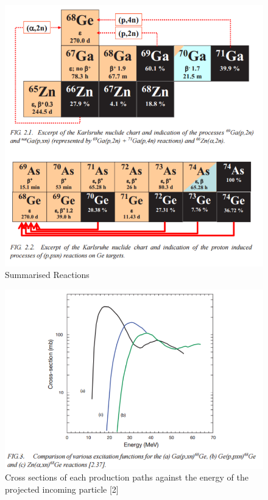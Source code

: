 \begin{figure}[h]
\centering
\includegraphics{Figures/C2F2}
\decoRule
\caption[C2F2]{Summarised Reactions}
\label{fig:C2F2}
\end{figure}

\begin{figure}[h]
\centering
\includegraphics{Figures/C2F3}
\decoRule
\caption[C2F3]{Cross sections of each production paths against the energy of the projected incoming particle [2]}
\label{fig:C2F3}
\end{figure}

